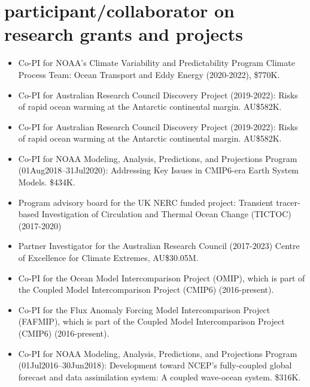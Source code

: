 \documentclass{article}
\begin{document}
\section*{\sc \color{Maroon}  participant/collaborator on research grants and projects}
\vspace{-.3cm}

\begin{itemize}[leftmargin=*]

\item Co-PI for NOAA's Climate Variability and Predictability Program Climate Process Team: Ocean Transport and Eddy Energy (2020-2022),
\$770K.

\item Co-PI for Australian Research Council Discovery Project (2019-2022): Risks of rapid ocean warming at the Antarctic continental margin. AU\$582K.

\item Co-PI for Australian Research Council Discovery Project (2019-2022): Risks of rapid ocean warming at the Antarctic continental margin. AU\$582K.

\item Co-PI for NOAA Modeling, Analysis, Predictions, and Projections Program (01Aug2018--31Jul2020): Addressing Key Issues in CMIP6-era Earth System Models. \$434K.
    
\item Program advisory board for the UK NERC funded project: Transient tracer-based Investigation of Circulation and Thermal Ocean Change (TICTOC) (2017-2020)

\item Partner Investigator for the Australian Research Council (2017-2023) Centre of Excellence for Climate Extremes, AU\$30.05M.
  
\item Co-PI for the Ocean Model Intercomparison Project (OMIP), which is part of the Coupled Model Intercomparison Project (CMIP6) (2016-present).    

\item Co-PI for the Flux Anomaly Forcing Model Intercomparison Project (FAFMIP), which is part of the Coupled Model Intercomparison Project (CMIP6) (2016-present).    

\item Co-PI for NOAA Modeling, Analysis, Predictions, and Projections Program (01Jul2016--30Jun2018): Development toward NCEP's fully-coupled global forecast and data assimilation system: A coupled wave-ocean
system.  \$316K.


\end{itemize}
\end{document}
